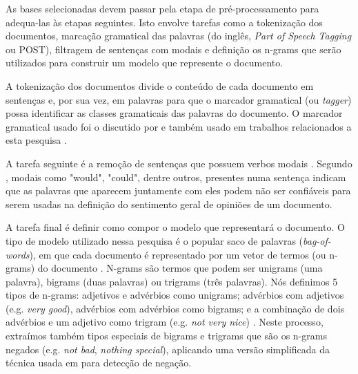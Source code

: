 As bases selecionadas devem passar pela etapa de pré-processamento para adequa-las às etapas seguintes. Isto envolve tarefas como    a tokenização dos documentos, marcação gramatical das palavras (do inglês, \textit{Part of Speech Tagging} ou POST), filtragem de sentenças com modais e definição os n-grams que serão utilizados para construir um modelo que represente o documento. 

A tokenização dos documentos divide o conteúdo de cada documento em sentenças e, por sua vez, em palavras para que o marcador gramatical (ou \textit{tagger}) possa identificar as classes gramaticais das palavras do documento. O marcador gramatical usado foi o discutido   por  e também usado em trabalhos relacionados a esta pesquisa \cite{chaovalit2005movie, taboada2008extracting, taboada2011lexicon}. 

A tarefa seguinte é a remoção de sentenças que possuem verbos modais . Segundo , modais como "would", "could", dentre outros, presentes numa sentença indicam que as palavras que aparecem juntamente com eles podem não ser confiáveis para serem usadas na definição do sentimento geral de opiniões de um documento. 

A tarefa final é definir como compor o modelo que representará o documento. O tipo de modelo utilizado nessa pesquisa é o popular saco de palavras (\textit{bag-of-words}), em que cada documento é representado por um vetor de termos (ou n-grams) do documento \cite{moraes2012document}. N-grams são termos que podem ser unigrams (uma palavra), bigrams (duas palavras) ou trigrams (três palavras).  Nós definimos 5 tipos de n-grams: adjetivos e advérbios como unigrams; advérbios com adjetivos (e.g. \textit{very good}), advérbios com advérbios como bigrams; e a combinação de dois advérbios e um adjetivo como trigram (e.g. \textit{not very nice}) \cite{pang2002thumbs, turney2002thumbs, taboada2008extracting, karamibekr2012verb}. Neste processo, extraímos também tipos especiais de bigrams e trigrams  que são os n-grams negados (e.g. \textit{not bad}, \textit{nothing special}), aplicando uma versão simplificada da técnica usada em \cite{taboada2011lexicon} para detecção de negação.  


